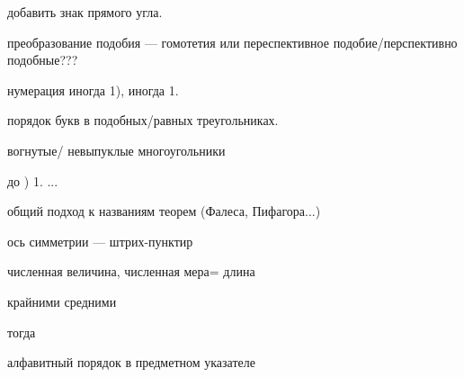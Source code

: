 





добавить знак прямого угла.






преобразование подобия --- гомотетия или переспективное подобие/перспективно подобные???






нумерация иногда 1), иногда 1.



порядок букв в подобных/равных треугольниках.

вогнутые/ невыпуклые многоугольники 

\smallskip до ) 1. ...

общий подход к названиям теорем (Фалеса, Пифагора...)

ось симметрии --- штрих-пунктир


численная величина, численная мера= длина


крайними средними



тогда

алфавитный порядок в предметном указателе
